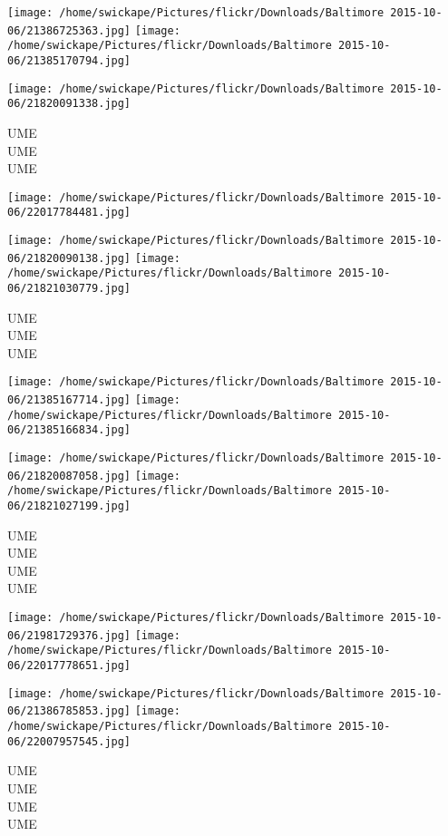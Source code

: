 \documentclass[10pt,letterpaper]{article}
\begin{document}
\texttt{[image: /home/swickape/Pictures/flickr/Downloads/Baltimore 2015-10-06/21386725363.jpg]}
\texttt{[image: /home/swickape/Pictures/flickr/Downloads/Baltimore 2015-10-06/21385170794.jpg]}

\texttt{[image: /home/swickape/Pictures/flickr/Downloads/Baltimore 2015-10-06/21820091338.jpg]}

UME\\
UME\\
UME\\
\pagebreak

\texttt{[image: /home/swickape/Pictures/flickr/Downloads/Baltimore 2015-10-06/22017784481.jpg]}

\vspace{0.25in}
\texttt{[image: /home/swickape/Pictures/flickr/Downloads/Baltimore 2015-10-06/21820090138.jpg]}
\texttt{[image: /home/swickape/Pictures/flickr/Downloads/Baltimore 2015-10-06/21821030779.jpg]}

UME\\
UME\\
UME\\
\pagebreak

\texttt{[image: /home/swickape/Pictures/flickr/Downloads/Baltimore 2015-10-06/21385167714.jpg]}
\texttt{[image: /home/swickape/Pictures/flickr/Downloads/Baltimore 2015-10-06/21385166834.jpg]}

\texttt{[image: /home/swickape/Pictures/flickr/Downloads/Baltimore 2015-10-06/21820087058.jpg]}
\texttt{[image: /home/swickape/Pictures/flickr/Downloads/Baltimore 2015-10-06/21821027199.jpg]}

UME\\
UME\\
UME\\
UME\\
\pagebreak

\texttt{[image: /home/swickape/Pictures/flickr/Downloads/Baltimore 2015-10-06/21981729376.jpg]}
\texttt{[image: /home/swickape/Pictures/flickr/Downloads/Baltimore 2015-10-06/22017778651.jpg]}

\texttt{[image: /home/swickape/Pictures/flickr/Downloads/Baltimore 2015-10-06/21386785853.jpg]}
\texttt{[image: /home/swickape/Pictures/flickr/Downloads/Baltimore 2015-10-06/22007957545.jpg]}

UME\\
UME\\
UME\\
UME\\
\pagebreak
\end{document}
